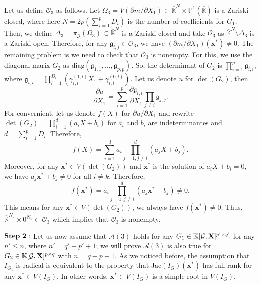 \documentclass[11pt]{article}
\numberwithin{Property}{section}
\numberwithin{Theorem}{section}
\numberwithin{Proposition}{section}
\numberwithin{Lemma}{section}
\numberwithin{Corollary}{section}
\numberwithin{Definition}{section}
\numberwithin{Remark}{section}
\numberwithin{Conjecture}{section}
\numberwithin{Problem}{section}
\numberwithin{Claim}{section}
\theoremstyle{definition}
\numberwithin{Example}{section}
\renewcommand{\leq}{\leqslant}
\def\bar{\overline}
\newcommand{\field}{\mathbb{K}} %
\newcommand{\mat}[1]{\mathbf{\MakeUppercase{#1}}} %
\begin{document}
Let us define $\mathcal{O}_3$ as follows. Let $\Omega_3 = V(\partial m / \partial X_1) \subset \bar{\field}^N \times \mathbb{P}^1(\bar{\field})$ is a Zariski closed, where here $N = 2p(\sum_{i=1}^pD_i)$ is the number of coefficients for $G_1$. Then, we define $\Delta_3 = \pi_{\mathcal{G}}(\Omega_3) \subset \bar{\field}^{N}$ is a Zariski closed and take $\mathcal{O}_3$ as $\bar{\field}^{N} \setminus \Delta_3$ is a Zariski open. Therefore, for any $\mathfrak{g}_{i,j} \in \mathcal{O}_3$, we have $(\partial m / \partial X_1) (\mathbf{x}^*) \ne 0$. The remaining problem is we need to check that $\mathcal{O}_3$ is nonempty. For this, we use the diagonal marix $G_2$ as $\mathrm{diag}(\mathfrak{g}_{1,1}, \ldots, \mathfrak{g}_{p,p})$. So, the determinant of $G_2$ is $\prod_{i=1}^p\mathfrak{g}_{i,i}$, where $\mathfrak{g}_{i,i} = \prod_{l=1}^{D_i}(\gamma_{i,i}^{(1,l)}X_1 + \gamma_{i,i}^{(0,l)})$. Let us denote $u$ for $\det(G_2)$, then 
\[
\frac{\partial u}{\partial X_1} = \sum_{i = 1}^p\frac{\partial \mathfrak{g}_{i,i}}{\partial X_1}\prod_{j \ne i} \mathfrak{g}_{j,j}.
\]
For convernient, let us denote $f(X)$ for ${\partial u}/{\partial X_1}$ and rewrite $\det(G_2) = \prod_{i=1}^d(a_iX + b_i)$ for $a_i$ and $b_i$ are indeterminantes and $d = \sum_{i=1}^pD_i$. Therefore, 
\[
f(X) = \sum_{i = 1}^d a_i \prod_{j=1, j \ne i}^d(a_jX + b_j).
\]
Moreover, for any $\mathbf{x}^* \in V(\det(G_2))$ and $\mathbf{x}^* $ is the solution of $a_i X+ b_i = 0$, we have $a_j \mathbf{x}^* + b_j \ne 0$ for all $i \ne k$. Therefore, \[f(\mathbf{x}^*) = a_i\prod_{j=1, j \ne i}^d(a_j\mathbf{x}^* + b_j) \ne 0. \]
This means for any $\mathbf{x}^* \in V(\det(G_2))$, we always have $f(\mathbf{x}^*) \ne 0$. Thus, $\bar{\field}^{N_2} \times 0^{N_1} \subset \mathcal{O}_3$ which implies that $\mathcal{O}_3$ is nonempty. 

$\bf{Step \ 2:}$ Let us now assume that $\mathcal{A}(3)$ holds for any $G_1 \in \field[{\mathcal{G}, \mat{X}}]^{p' \times q'}$ for any $n' \leq n$, where $n' = q'-p'+1$; we will prove $\mathcal{A}(3)$ is also true for $G_2 \in \field[\mathcal{G}, \mat{X}]^{p \times q}$ with $n = q-p+1$. As we noticed before, the assumption that $I_{G_1}$ is radical is equivalent to the property that $\mathrm{Jac}(I_{G})(\mathbf{x}^*)$ has full rank for any $\mathbf{x}^* \in V(I_{G})$. In other words, $\mathbf{x}^* \in V(I_{G})$ is a simple root in $V(I_G)$. 
\end{document}
